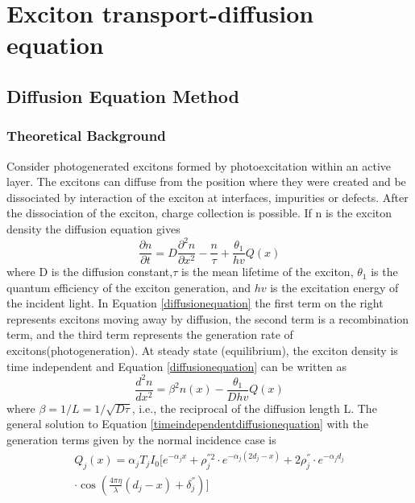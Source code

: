 \documentclass{article}
\begin{document}
\section{Exciton transport-diffusion equation
}
\subsection{Diffusion Equation Method~\cite{pettersson1999modeling}}
\subsubsection{Theoretical Background}
Consider photogenerated excitons formed by photoexcitation within an active
layer. The excitons can diffuse from the position where they were created and
be dissociated by interaction of the exciton at interfaces, impurities or
defects. After the dissociation of the exciton, charge collection is possible.
If n is the exciton density the diffusion equation gives
\begin{equation}
\frac{\partial n}{\partial t}=D\frac{{{\partial }^{2}}n}{\partial
{{x}^{2}}}-\frac{n}{\tau }+\frac{{{\theta }_{1}}}{hv}Q(x)
\label{diffusionequation} 
\end{equation}
where D is the diffusion constant,$\tau$ is the mean lifetime of the exciton,
$\theta_1$ is the quantum efficiency of the exciton generation, and $hv$ is the
excitation energy of the incident light. In Equation \ref{diffusionequation} the
first term on the right represents excitons moving away by diffusion, the second
term is a recombination term, and the third term represents the generation rate
of excitons(photogeneration). At steady state (equilibrium), the exciton density
is time independent and Equation \ref{diffusionequation} can be written as
\begin{equation}
\frac{{{d}^{2}}n}{d{{x}^{2}}}={{\beta }^{2}}n(x)-\frac{{{\theta
}_{1}}}{Dhv}Q(x)
\label{timeindependentdiffusionequation} 
\end{equation}
where $\beta =1/L=1/\sqrt{D\tau }$, i.e., the reciprocal of the diffusion length
L. The general solution to Equation \ref{timeindependentdiffusionequation} with
the generation terms given by the normal incidence case is
\begin{equation}
\begin{multlined}
   {{Q}_{j}}(x)={{\alpha }_{j}}{{T}_{j}}{{I}_{0}}[{{e}^{-{{\alpha }_{j}}x}}+\rho _{j}^{''2}\cdot {{e}^{-{{\alpha }_{j}}(2{{d}_{j}}-x)}}+2\rho _{j}^{''}\cdot {{e}^{-{{\alpha }_{j}}{{d}_{j}}}} \\ 
  \cdot \cos \left( \frac{4\pi \eta }{\lambda }({{d}_{j}}-x)+\delta _{j}^{''} \right)]  
\end{multlined}
\end{equation}
\end{document}
